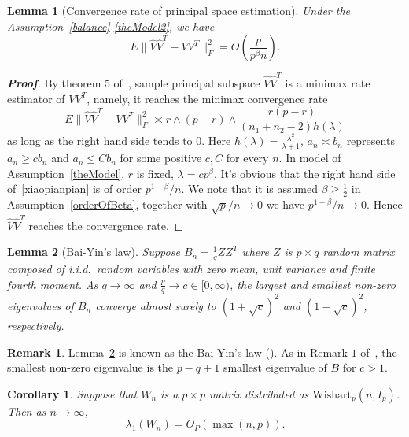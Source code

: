 \documentclass[review]{elsarticle}
\theoremstyle{plain}
\newtheorem{corollary}{\quad\quad Corollary}
\newtheorem{lemma}{\quad\quad Lemma}
\theoremstyle{definition}
\newtheorem{remark}{\quad\quad Remark}
\theoremstyle{remark}
\begin{document}
\begin{lemma}[Convergence rate of principal space estimation]
    Under the Assumption~\ref{balance}-\ref{theModel2}, we have
\begin{equation*}
E\|\hat{V}\hat{V}^T-VV^T\|^2_F =O(\frac{p}{p^{\beta}n}).
\end{equation*}
\end{lemma}


\begin{proof}[\textbf{Proof}]
    By theorem 5 of~\cite{Cai2012Sparse}, sample principal subspace $\hat{V}\hat{V}^T$ is a minimax rate estimator of $VV^T$, namely, it reaches the minimax convergence rate
    \begin{equation}\label{xiaopianpian}
         E\|\hat{V}\hat{V}^T-VV^T\|^2_F\asymp r\wedge (p-r)\wedge \frac{r(p-r)}{(n_1+n_2-2)h(\lambda)}
    \end{equation}
    as long as the right hand side tends to $0$. Here $h(\lambda)=\frac{\lambda^2}{\lambda+1}$, $a_n\asymp b_n$ represents $a_n\geq cb_n$ and $a_n\leq Cb_n$ for some positive $c,C$ for every $n$. In model of Assumption~\ref{theModel},  $r$ is fixed, $\lambda=cp^\beta$.
    It's obvious that the right hand side of~\eqref{xiaopianpian} is of order ${p^{1-\beta}}/{n}$.
    We note that it is assumed $\beta\geq \frac{1}{2}$ in Assumption~\ref{orderOfBeta}, together with ${\sqrt{p}}/{n}\to 0$ we have
    ${p^{1-\beta}}/{n}\to 0$. Hence
    $\hat{V}\hat{V}^T$ reaches the convergence rate.

\end{proof}
\begin{lemma}[Bai-Yin's law]\label{baiyin}
    Suppose $B_n=\frac{1}{q} Z Z^T$ where $Z$ is $p\times q$ random matrix composed of i.i.d.\ random variables with zero mean, unit variance and finite fourth moment.
    As $q\to \infty$ and $\frac{p}{q}\to c\in [0,\infty)$, the largest and smallest non-zero eigenvalues of $B_n$ converge almost surely to ${(1+\sqrt{c})}^2$ and $(1-\sqrt{c})^2$, respectively.
\end{lemma}
\begin{remark}
    Lemma~\ref{baiyin} is known as the Bai-Yin's law (\cite{bai1993limit}). As in Remark $1$ of~\cite{bai1993limit}, the smallest non-zero eigenvalue is the $p-q+1$ smallest eigenvalue of $B$ for $c>1$.
\end{remark}
\begin{corollary}\label{maxEigen}
    Suppose that $W_n$ is a $p \times p$ matrix distributed as $\mathrm{Wishart}_p(n,I_{p})$. Then as $n\to \infty$,
    $$
        \lambda_1(W_n)=O_P(\max(n,p)).
    $$
\end{corollary}
\end{document}
